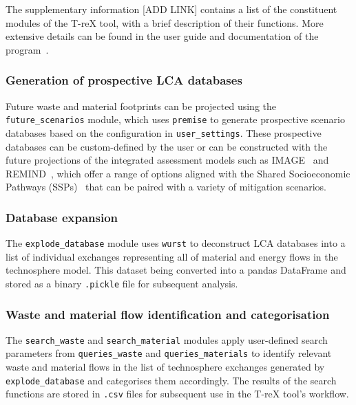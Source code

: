 The supplementary information [ADD LINK] contains a list of the constituent modules of the T-reX tool, with a brief description of their functions. More extensive details can be found in the user guide and documentation of the program~\citep{mcdowall2023T-reXdocs}.


\subsubsection{Generation of prospective LCA databases}
Future waste and material footprints can be projected using the \texttt{future\_scenarios} module, which uses \texttt{premise} to generate prospective scenario databases based on the configuration in \texttt{user\_settings}. These prospective databases can be custom-defined by the user or can be constructed with the future projections of the integrated assessment models such as IMAGE~\citep{stehfest2014image} and REMIND~\citep{remind2020model}, which offer a range of options aligned with the Shared Socioeconomic Pathways (SSPs)~\citep{ssp2020ghg}  that can be paired with a variety of mitigation scenarios.

\subsubsection{Database expansion}
The \texttt{explode\_database} module uses \texttt{wurst} to deconstruct LCA databases into a list of individual exchanges representing all of material and energy flows in the technosphere model. This dataset being converted into a pandas DataFrame and stored as a binary \texttt{.pickle} file for subsequent analysis.

\subsubsection{Waste and material flow identification and categorisation}

The \texttt{search\_waste} and \texttt{search\_material} modules apply user-defined search parameters from \texttt{queries\_waste} and \texttt{queries\_materials} to identify relevant waste and material flows in the list of technosphere exchanges generated by \texttt{explode\_database} and categorises them accordingly. The results of the search functions are stored in \texttt{.csv} files for subsequent use in the T-reX tool's workflow.


